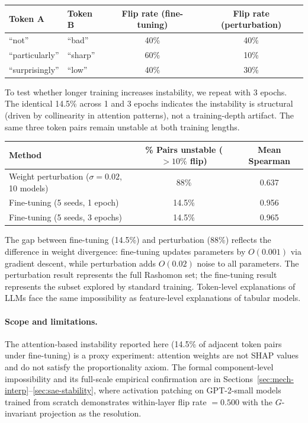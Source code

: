 \documentclass{article}
\begin{document}
\begin{center}
\small
\begin{tabular}{@{}llcc@{}}
\toprule
Token A & Token B & Flip rate (fine-tuning) & Flip rate (perturbation) \\
\midrule
``not'' & ``bad'' & 40\% & 40\% \\
``particularly'' & ``sharp'' & 60\% & 10\% \\
``surprisingly'' & ``low'' & 40\% & 30\% \\
\bottomrule
\end{tabular}
\end{center}

To test whether longer training increases instability, we repeat with 3 epochs. The identical 14.5\% across 1 and 3 epochs indicates the instability is structural (driven by collinearity in attention patterns), not a training-depth artifact. The same three token pairs remain unstable at both training lengths.

\begin{center}
\small
\begin{tabular}{@{}lcc@{}}
\toprule
Method & \% Pairs unstable ($>10\%$ flip) & Mean Spearman \\
\midrule
Weight perturbation ($\sigma{=}0.02$, 10 models) & 88\% & 0.637 \\
Fine-tuning (5 seeds, 1 epoch) & 14.5\% & 0.956 \\
Fine-tuning (5 seeds, 3 epochs) & 14.5\% & 0.965 \\
\bottomrule
\end{tabular}
\end{center}

The gap between fine-tuning (14.5\%) and perturbation (88\%) reflects the difference in weight divergence: fine-tuning updates parameters by $O(0.001)$ via gradient descent, while perturbation adds $O(0.02)$ noise to all parameters. The perturbation result represents the full Rashomon set; the fine-tuning result represents the subset explored by standard training. Token-level explanations of LLMs face the same impossibility as feature-level explanations of tabular models.

\paragraph{Scope and limitations.}
The attention-based instability reported here (14.5\% of adjacent token pairs under fine-tuning) is a proxy experiment: attention weights are not SHAP values and do not satisfy the proportionality axiom. The formal component-level impossibility and its full-scale empirical confirmation are in Sections~\ref{sec:mech-interp}--\ref{sec:sae-stability}, where activation patching on GPT-2-small models trained from scratch demonstrates within-layer flip rate $= 0.500$ with the $G$-invariant projection as the resolution.
\end{document}
